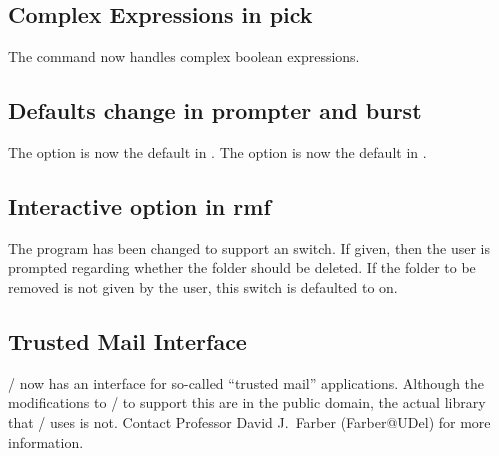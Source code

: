 \subsection*	{Complex Expressions in pick}
The  command now handles complex boolean expressions.

\subsection*	{Defaults change in prompter and burst}
The  option is now the default in .
The  option is now the default in .

\subsection*	{Interactive option in rmf}
The  program has been changed to support an 
switch.
If given,
then the user is prompted regarding whether the folder should be deleted.
If the folder to be removed is not given by the user,
this switch is defaulted to on.

\subsection*	{Trusted Mail Interface}
\MH/ now has an interface for so-called ``trusted mail'' applications.
Although the modifications to \MH/ to support this are in the public domain,
the actual library that \MH/ uses is not.
Contact Professor David J.~Farber ({\sf Farber@UDel\/}) for more information.



\showsummary


